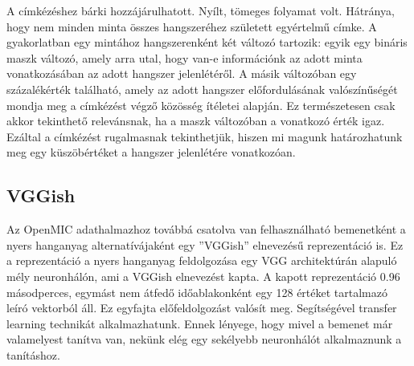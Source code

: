 A címkézéshez bárki hozzájárulhatott. Nyílt, tömeges folyamat volt. Hátránya, hogy nem minden minta összes hangszeréhez született egyértelmű címke. A gyakorlatban egy mintához hangszerenként két változó tartozik: egyik egy bináris maszk változó, amely arra utal, hogy van-e információnk az adott minta vonatkozásában az adott hangszer jelenlétéről. A másik változóban egy százalékérték található, amely az adott hangszer előfordulásának valószínűségét mondja meg a címkézést végző közösség ítéletei alapján. Ez természetesen csak akkor tekinthető relevánsnak, ha a maszk változóban a vonatkozó érték igaz. Ezáltal a címkézést rugalmasnak tekinthetjük, hiszen mi magunk határozhatunk meg egy küszöbértéket a hangszer jelenlétére vonatkozóan. \cite{humphrey2018openmic}

\subsection{VGGish}

Az OpenMIC adathalmazhoz továbbá csatolva van felhasználható bemenetként a nyers hanganyag alternatívájaként egy ''VGGish'' elnevezésű reprezentáció is. Ez a reprezentáció a nyers hanganyag feldolgozása egy VGG \cite{vgg} architektúrán alapuló mély neuronhálón, ami a VGGish elnevezést kapta. A kapott reprezentáció 0.96 másodperces, egymást nem átfedő időablakonként egy 128 értéket tartalmazó leíró vektorból áll. Ez egyfajta előfeldolgozást valósít meg. Segítségével transfer learning technikát alkalmazhatunk. Ennek lényege, hogy mivel a bemenet már valamelyest tanítva van, nekünk elég egy sekélyebb neuronhálót alkalmaznunk a tanításhoz.